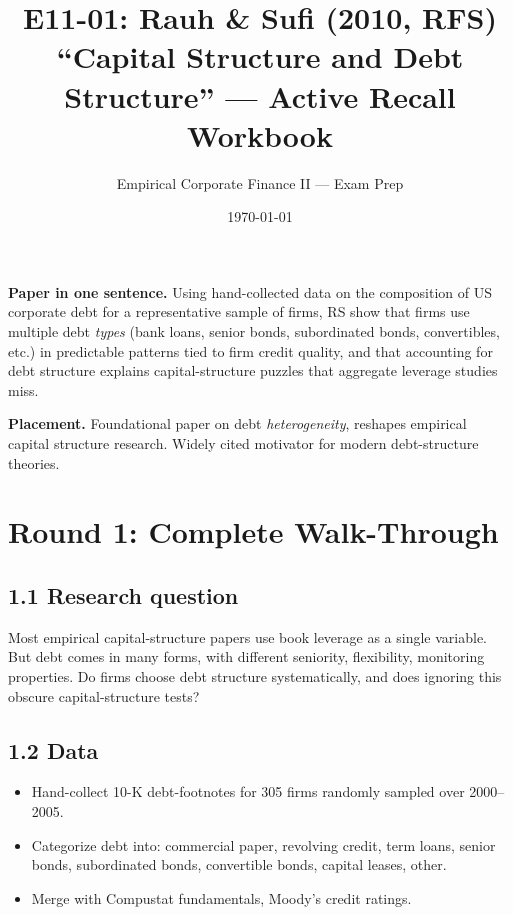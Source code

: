 \documentclass[11pt]{article}
\title{E11-01: Rauh \& Sufi (2010, RFS) \\
\large ``Capital Structure and Debt Structure'' --- Active Recall Workbook}
\author{Empirical Corporate Finance II --- Exam Prep}
\date{\today}
\begin{document}
\maketitle

\begin{keybox}
\textbf{Paper in one sentence.} Using hand-collected data on the composition of US corporate debt for a representative sample of firms, RS show that firms use multiple debt \emph{types} (bank loans, senior bonds, subordinated bonds, convertibles, etc.) in predictable patterns tied to firm credit quality, and that accounting for debt structure explains capital-structure puzzles that aggregate leverage studies miss.

\textbf{Placement.} Foundational paper on debt \emph{heterogeneity}, reshapes empirical capital structure research. Widely cited motivator for modern debt-structure theories.
\end{keybox}

\section*{Round 1: Complete Walk-Through}

\subsection*{1.1 Research question}
Most empirical capital-structure papers use book leverage as a single variable. But debt comes in many forms, with different seniority, flexibility, monitoring properties. Do firms choose debt structure systematically, and does ignoring this obscure capital-structure tests?

\subsection*{1.2 Data}
\begin{itemize}
\item Hand-collect 10-K debt-footnotes for 305 firms randomly sampled over 2000--2005.
\item Categorize debt into: commercial paper, revolving credit, term loans, senior bonds, subordinated bonds, convertible bonds, capital leases, other.
\item Merge with Compustat fundamentals, Moody's credit ratings.
\end{itemize}
\end{document}
